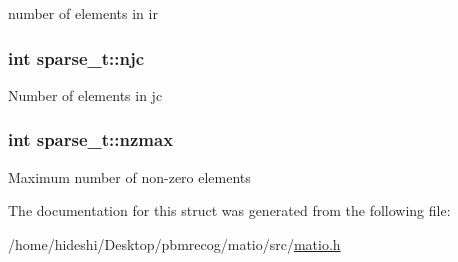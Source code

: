 number of elements in ir \hypertarget{structsparse__t_aa0ef6a0c8be3ad0e3a222371e68f7dd4}{
\subsubsection[{njc}]{\setlength{\rightskip}{0pt plus 5cm}int {\bf sparse\-\_\-t\-::njc}}}\label{structsparse__t_aa0ef6a0c8be3ad0e3a222371e68f7dd4}
\-Number of elements in jc \hypertarget{structsparse__t_afd116055ad6a18c27b80333fdac45827}{
\subsubsection[{nzmax}]{\setlength{\rightskip}{0pt plus 5cm}int {\bf sparse\-\_\-t\-::nzmax}}}\label{structsparse__t_afd116055ad6a18c27b80333fdac45827}
\-Maximum number of non-\/zero elements 

\-The documentation for this struct was generated from the following file\-:\begin{DoxyCompactItemize}
\item 
/home/hideshi/\-Desktop/pbmrecog/matio/src/\hyperlink{matio_8h}{matio.\-h}\end{DoxyCompactItemize}
